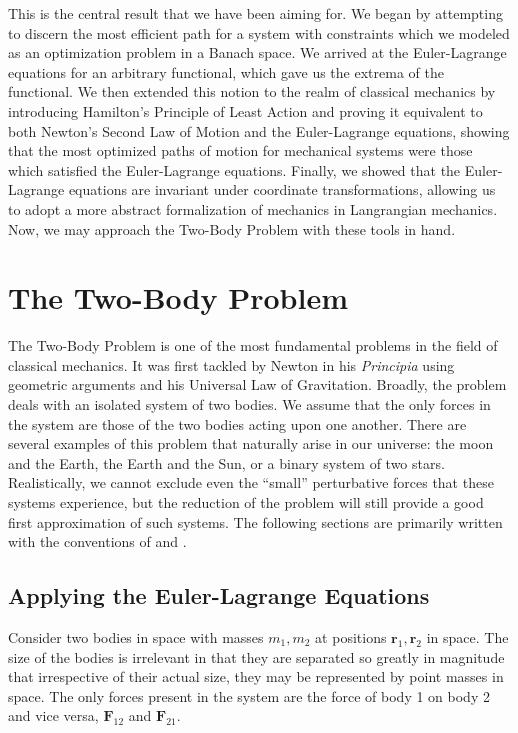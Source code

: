 \documentclass[10pt, psamsfonts]{amsart}
\theoremstyle{definition}
\theoremstyle{remark}
\numberwithin{equation}{section}
\begin{document}
This is the central result that we have been aiming for. We began by attempting to discern the most efficient path for a system with constraints which we modeled as an optimization problem in a Banach space. We arrived at the Euler-Lagrange equations for an arbitrary functional, which gave us the extrema of the functional. We then extended this notion to the realm of classical mechanics by introducing Hamilton's Principle of Least Action and proving it equivalent to both Newton's Second Law of Motion and the Euler-Lagrange equations, showing that the most optimized paths of motion for mechanical systems were those which satisfied the Euler-Lagrange equations. Finally, we showed that the Euler-Lagrange equations are invariant under coordinate transformations, allowing us to adopt a more abstract formalization of mechanics in Langrangian mechanics. Now, we may approach the Two-Body Problem with these tools in hand.

\section{The Two-Body Problem}
The Two-Body Problem is one of the most fundamental problems in the field of classical mechanics. It was first tackled by Newton in his \textit{Principia} using geometric arguments and his Universal Law of Gravitation. Broadly, the problem deals with an isolated system of two bodies. We assume that the only forces in the system are those of the two bodies acting upon one another. There are several examples of this problem that naturally arise in our universe: the moon and the Earth, the Earth and the Sun, or a binary system of two stars. Realistically, we cannot exclude even the ``small'' perturbative forces that these systems experience, but the reduction of the problem will still provide a good first approximation of such systems. The following sections are primarily written with the conventions of \cite[Morin]{6} and \cite[Taylor]{7}.

\subsection{Applying the Euler-Lagrange Equations}
Consider two bodies in space with masses $m_1, m_2$ at positions $\bm{r}_1, \bm{r}_2$ in space. The size of the bodies is irrelevant in that they are separated so greatly in magnitude that irrespective of their actual size, they may be represented by point masses in space. The only forces present in the system are the force of body 1 on body 2 and vice versa, $\bm{F}_{12} $ and $\bm{F}_{21}$. \\
\end{document}
